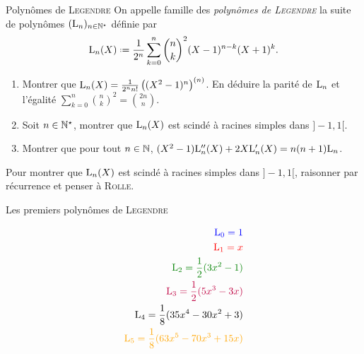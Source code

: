 \begin{defi}{Polynômes de \textsc{Legendre}}
    On appelle famille des \emph{polynômes de \textsc{Legendre}} la suite de polynômes $(\mathrm{L}_n)_{n \in \mathbb{N}^\star}$ définie par
    $$\Leg_n(X) \defeq \frac{1}{2^n} \sum_{k=0}^{n} \binom{n}{k}^2 (X-1)^{n-k}(X+1)^{k}.$$
\end{defi}


\begin{exercice}
    \begin{enumerate}
        \item Montrer que $\mathrm{L}_n(X) = \frac{1}{2^n n!} \left( (X^2-1)^n \right)^{(n)}$. En déduire la parité de $\mathrm{L}_n$ et l'égalité $\sum\limits_{k=0}^n \binom{n}{k}^2 = \binom{2n}{n}$.
        \item Soit $n \in \mathbb{N}^\star$, montrer que $\mathrm{L}_n(X)$ est scindé à racines simples dans $]-1, 1[$. 
        \item Montrer que pour tout $n \in \mathbb{N}$, $(X^2-1) \mathrm{L}''_n(X) + 2X \mathrm{L}'_n(X) = n(n+1) \mathrm{L}_n$.
    \end{enumerate}
\end{exercice}  

\begin{elem_sol}
    Pour montrer que $\mathrm{L}_n(X)$ est scindé à racines simples dans $]-1, 1[$, raisonner par récurrence et penser à \textsc{Rolle}. 
\end{elem_sol}

\begin{marginfigure}[-11.5cm]
    \centering
	
	\caption*{\centering Les premiers polynômes de \textsc{Legendre}}
	\small
	\begin{align*}
	    \color{blue} \Leg_0 = 1 \\
	    \color{red} \Leg_1 = x \\
	    \color{green} \Leg_2 = \frac{1}{2}(3x^2-1) \\
	    \color{purple} \Leg_3 = \frac{1}{2}(5x^3-3x) \\
	    \color{black} \Leg_4 = \frac{1}{8}(35x^4-30x^2+3) \\
	    \color{orange} \Leg_5 = \frac{1}{8}(63x^5-70x^3+15x)
	\end{align*}
\end{marginfigure}

